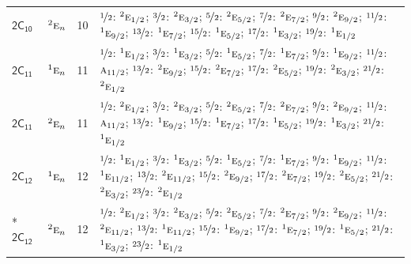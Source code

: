 \documentclass[10pt,a4paper]{article}
\numberwithin{equation}{section}
\newcommand{\grp}[1]{\mathsf{#1}}
\newcommand{\irr}[1]{\text{\normalfont\scshape #1}}
\newcommand{\conjpair}[1]{{}^{#1}}
\newlength{\fillwidth}\newlength{\cellwidth}\newlength{\colwidth}
\begin{document}
{\begin{longtable}{@{}llr>{\RaggedRight\arraybackslash}p{\fillwidth}@{}}
\href{2C10.pdf}{$\grp{2C_{10}}$} & $\conjpair{2}\irr{e}_{n}$ & 10 & $\nicefrac{1}{2}$: $\conjpair{2}\irr{e}_{1/2}$; $\nicefrac{3}{2}$: $\conjpair{2}\irr{e}_{3/2}$; $\nicefrac{5}{2}$: $\conjpair{2}\irr{e}_{5/2}$; $\nicefrac{7}{2}$: $\conjpair{2}\irr{e}_{7/2}$; $\nicefrac{9}{2}$: $\conjpair{2}\irr{e}_{9/2}$; $\nicefrac{11}{2}$: $\conjpair{1}\irr{e}_{9/2}$; $\nicefrac{13}{2}$: $\conjpair{1}\irr{e}_{7/2}$; $\nicefrac{15}{2}$: $\conjpair{1}\irr{e}_{5/2}$; $\nicefrac{17}{2}$: $\conjpair{1}\irr{e}_{3/2}$; $\nicefrac{19}{2}$: $\conjpair{1}\irr{e}_{1/2}$\\
\href{2C11.pdf}{$\grp{2C_{11}}$} & $\conjpair{1}\irr{e}_{n}$ & 11 & $\nicefrac{1}{2}$: $\conjpair{1}\irr{e}_{1/2}$; $\nicefrac{3}{2}$: $\conjpair{1}\irr{e}_{3/2}$; $\nicefrac{5}{2}$: $\conjpair{1}\irr{e}_{5/2}$; $\nicefrac{7}{2}$: $\conjpair{1}\irr{e}_{7/2}$; $\nicefrac{9}{2}$: $\conjpair{1}\irr{e}_{9/2}$; $\nicefrac{11}{2}$: $\irr{a}_{11/2}$; $\nicefrac{13}{2}$: $\conjpair{2}\irr{e}_{9/2}$; $\nicefrac{15}{2}$: $\conjpair{2}\irr{e}_{7/2}$; $\nicefrac{17}{2}$: $\conjpair{2}\irr{e}_{5/2}$; $\nicefrac{19}{2}$: $\conjpair{2}\irr{e}_{3/2}$; $\nicefrac{21}{2}$: $\conjpair{2}\irr{e}_{1/2}$\\
\href{2C11.pdf}{$\grp{2C_{11}}$} & $\conjpair{2}\irr{e}_{n}$ & 11 & $\nicefrac{1}{2}$: $\conjpair{2}\irr{e}_{1/2}$; $\nicefrac{3}{2}$: $\conjpair{2}\irr{e}_{3/2}$; $\nicefrac{5}{2}$: $\conjpair{2}\irr{e}_{5/2}$; $\nicefrac{7}{2}$: $\conjpair{2}\irr{e}_{7/2}$; $\nicefrac{9}{2}$: $\conjpair{2}\irr{e}_{9/2}$; $\nicefrac{11}{2}$: $\irr{a}_{11/2}$; $\nicefrac{13}{2}$: $\conjpair{1}\irr{e}_{9/2}$; $\nicefrac{15}{2}$: $\conjpair{1}\irr{e}_{7/2}$; $\nicefrac{17}{2}$: $\conjpair{1}\irr{e}_{5/2}$; $\nicefrac{19}{2}$: $\conjpair{1}\irr{e}_{3/2}$; $\nicefrac{21}{2}$: $\conjpair{1}\irr{e}_{1/2}$\\
\href{2C12.pdf}{$\grp{2C_{12}}$} & $\conjpair{1}\irr{e}_{n}$ & 12 & $\nicefrac{1}{2}$: $\conjpair{1}\irr{e}_{1/2}$; $\nicefrac{3}{2}$: $\conjpair{1}\irr{e}_{3/2}$; $\nicefrac{5}{2}$: $\conjpair{1}\irr{e}_{5/2}$; $\nicefrac{7}{2}$: $\conjpair{1}\irr{e}_{7/2}$; $\nicefrac{9}{2}$: $\conjpair{1}\irr{e}_{9/2}$; $\nicefrac{11}{2}$: $\conjpair{1}\irr{e}_{11/2}$; $\nicefrac{13}{2}$: $\conjpair{2}\irr{e}_{11/2}$; $\nicefrac{15}{2}$: $\conjpair{2}\irr{e}_{9/2}$; $\nicefrac{17}{2}$: $\conjpair{2}\irr{e}_{7/2}$; $\nicefrac{19}{2}$: $\conjpair{2}\irr{e}_{5/2}$; $\nicefrac{21}{2}$: $\conjpair{2}\irr{e}_{3/2}$; $\nicefrac{23}{2}$: $\conjpair{2}\irr{e}_{1/2}$\\*
\href{2C12.pdf}{$\grp{2C_{12}}$} & $\conjpair{2}\irr{e}_{n}$ & 12 & $\nicefrac{1}{2}$: $\conjpair{2}\irr{e}_{1/2}$; $\nicefrac{3}{2}$: $\conjpair{2}\irr{e}_{3/2}$; $\nicefrac{5}{2}$: $\conjpair{2}\irr{e}_{5/2}$; $\nicefrac{7}{2}$: $\conjpair{2}\irr{e}_{7/2}$; $\nicefrac{9}{2}$: $\conjpair{2}\irr{e}_{9/2}$; $\nicefrac{11}{2}$: $\conjpair{2}\irr{e}_{11/2}$; $\nicefrac{13}{2}$: $\conjpair{1}\irr{e}_{11/2}$; $\nicefrac{15}{2}$: $\conjpair{1}\irr{e}_{9/2}$; $\nicefrac{17}{2}$: $\conjpair{1}\irr{e}_{7/2}$; $\nicefrac{19}{2}$: $\conjpair{1}\irr{e}_{5/2}$; $\nicefrac{21}{2}$: $\conjpair{1}\irr{e}_{3/2}$; $\nicefrac{23}{2}$: $\conjpair{1}\irr{e}_{1/2}$\\

\end{longtable}}
\end{document}

